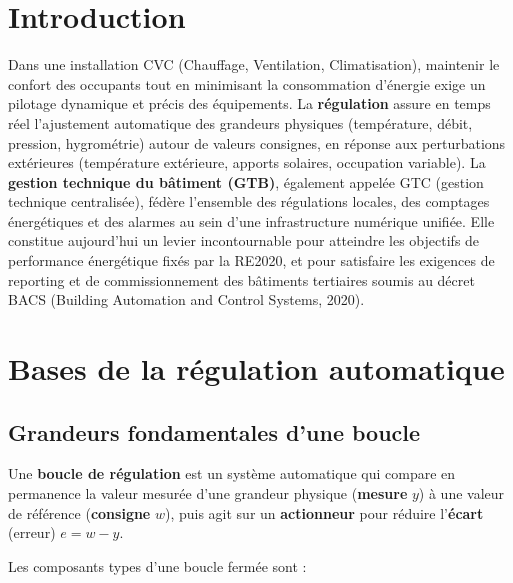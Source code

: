 \section{Introduction}

Dans une installation CVC (Chauffage, Ventilation, Climatisation), maintenir le confort des occupants tout en minimisant la consommation d'énergie exige un pilotage dynamique et précis des équipements. La \textbf{régulation} assure en temps réel l'ajustement automatique des grandeurs physiques (température, débit, pression, hygrométrie) autour de valeurs consignes, en réponse aux perturbations extérieures (température extérieure, apports solaires, occupation variable). La \textbf{gestion technique du bâtiment (GTB)}, également appelée GTC (gestion technique centralisée), fédère l'ensemble des régulations locales, des comptages énergétiques et des alarmes au sein d'une infrastructure numérique unifiée. Elle constitue aujourd'hui un levier incontournable pour atteindre les objectifs de performance énergétique fixés par la RE2020, et pour satisfaire les exigences de reporting et de commissionnement des bâtiments tertiaires soumis au décret BACS (Building Automation and Control Systems, 2020).

\section{Bases de la régulation automatique}

\subsection{Grandeurs fondamentales d'une boucle}

\begin{definition}
  Une \textbf{boucle de régulation} est un système automatique qui compare en permanence la valeur mesurée d'une grandeur physique (\textbf{mesure} $y$) à une valeur de référence (\textbf{consigne} $w$), puis agit sur un \textbf{actionneur} pour réduire l'\textbf{écart} (erreur) $e = w - y$.
\end{definition}

Les composants types d'une boucle fermée sont :

